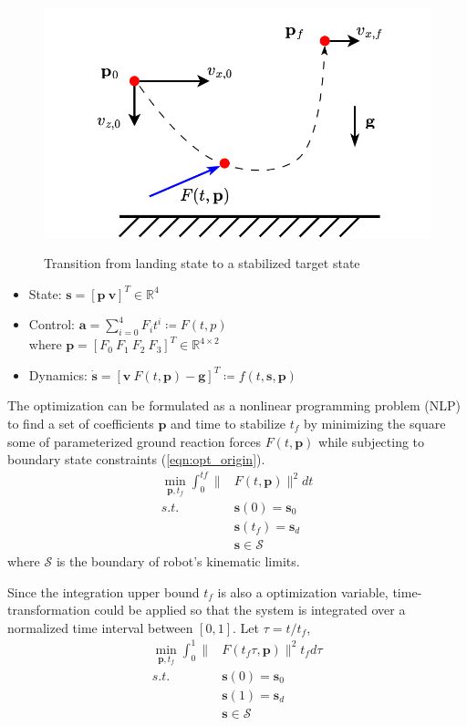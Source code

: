 \documentclass[11pt, conference]{IEEEtran}
\theoremstyle{definition} %
\newcommand{\RR}{\mathbb{R}}
\begin{document}
\begin{figure}[htb]
    \centering
        \textsf{\includegraphics[width=0.7\columnwidth]{figures/traj_opt.png}}
        \caption{Transition from landing state to a stabilized target state}
        \label{fig:shooting_diagram}
\end{figure}

\begin{itemize}
    \item State: $\mathbf{s} = [\mathbf{p}\ \mathbf{v}]^T \in \RR^4$
    \item Control: $\mathbf{a} = \sum^4_{i=0} F_it^i \coloneqq F(t, p)$ \\
    where $\mathbf{p} = [F_0\ F_1\ F_2\ F_3]^T\in \RR^{4\times2}$
    \item Dynamics: $\dot{\mathbf{s}} = [\mathbf{v}\ F(t, \mathbf{p}) - \mathbf{g}]^T \coloneqq f(t, \mathbf{s}, \mathbf{p})$
\end{itemize}

The optimization can be formulated as a nonlinear programming problem (NLP) to find a set of coefficients $\mathbf{p}$ and time to stabilize $t_f$ by minimizing the square some of parameterized ground reaction forces $F(t, \mathbf{p})$ while subjecting to boundary state constraints (\ref{eqn:opt_origin}).
\begin{equation}
    \begin{aligned}
        \min_{\mathbf{p}, t_f} \int_0^{tf}\|&F(t, \mathbf{p})\|^2dt\\
        s.t.\quad\quad &\mathbf{s}(0) = \mathbf{s}_0\\
        &\mathbf{s}(t_f) = \mathbf{s}_d\\
        &\mathbf{s} \in \mathcal{S}
    \end{aligned}
    \label{eqn:opt_origin}
\end{equation}
where $\mathcal{S}$ is the boundary of robot's kinematic limits.

Since the integration upper bound $t_f$ is also a optimization variable, time-transformation could be applied so that the system is integrated over a normalized time interval between $[0, 1]$. Let $\tau = t/t_f$,
\begin{equation}
    \begin{aligned}
        \min_{\mathbf{p}, t_f} \int_0^{1}\|&F(t_f \tau, \mathbf{p})\|^2t_f d\tau\\
        s.t.\quad\quad &\mathbf{s}(0) = \mathbf{s}_0\\
        &\mathbf{s}(1) = \mathbf{s}_d\\
        &\mathbf{s} \in \mathcal{S}
    \end{aligned}
\end{equation}
\end{document}
